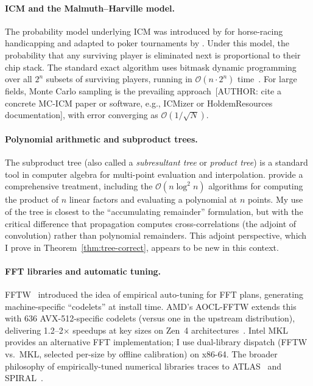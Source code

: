 \documentclass[11pt]{article}
\newcommand{\bigO}{\mathcal{O}}
\begin{document}
\paragraph{ICM and the Malmuth--Harville model.}
The probability model underlying ICM was introduced by
\citet{harville1973} for horse-racing handicapping and adapted to poker
tournaments by \citet{malmuth2001}. Under this model, the probability
that any surviving player is eliminated next is proportional to their
chip stack. The standard exact algorithm uses bitmask dynamic programming
over all $2^n$ subsets of surviving players, running in
$\bigO(n \cdot 2^n)$ time~\citep[and references therein]{malmuth2001}.
For large fields, Monte Carlo sampling is the prevailing
approach~[AUTHOR: cite a concrete MC-ICM paper or software, e.g., ICMizer
or HoldemResources documentation], with error converging as
$\bigO(1/\sqrt{N})$.

\paragraph{Polynomial arithmetic and subproduct trees.}
The subproduct tree (also called a \emph{subresultant tree} or
\emph{product tree}) is a standard tool in computer algebra for
multi-point evaluation and interpolation.
\citet{vonzurgathen2013} provide a comprehensive treatment, including the
$\bigO(n \log^2 n)$ algorithms for computing the product of $n$ linear
factors and evaluating a polynomial at $n$ points. My use of the tree is
closest to the ``accumulating remainder'' formulation, but with the
critical difference that propagation computes cross-correlations (the
adjoint of convolution) rather than polynomial remainders. This adjoint
perspective, which I prove in Theorem~\ref{thm:tree-correct}, appears to
be new in this context.

\paragraph{FFT libraries and automatic tuning.}
FFTW~\citep{frigo2005} introduced the idea of empirical auto-tuning for
FFT plans, generating machine-specific ``codelets'' at install time.
AMD's AOCL-FFTW extends this with 636 AVX-512-specific codelets (versus
one in the upstream distribution), delivering 1.2--2$\times$ speedups at
key sizes on Zen~4 architectures~\citep{aocl2024}. Intel
MKL~\citep{intel2024mkl} provides an alternative FFT implementation;
I use dual-library dispatch (FFTW vs.\ MKL, selected per-size by
offline calibration) on x86-64. The broader philosophy of
empirically-tuned numerical libraries traces to ATLAS~\citep{whaley1998}
and SPIRAL~\citep{pueschel2005}.
\end{document}

